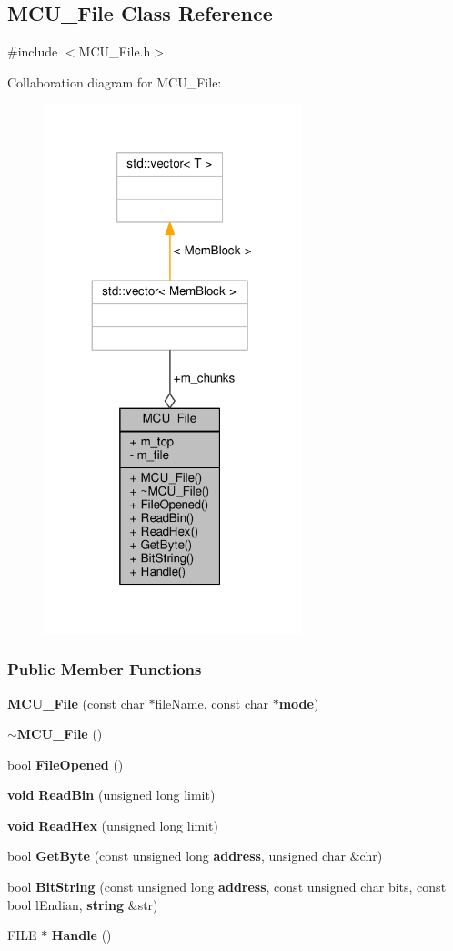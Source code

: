 \subsection{M\+C\+U\+\_\+\+File Class Reference}
\label{classMCU__File}


{\ttfamily \#include $<$M\+C\+U\+\_\+\+File.\+h$>$}



Collaboration diagram for M\+C\+U\+\_\+\+File\+:
\nopagebreak
\begin{figure}[H]
\begin{center}
\leavevmode
\includegraphics[width=212pt]{dc/d54/classMCU__File__coll__graph}
\end{center}
\end{figure}
\subsubsection*{Public Member Functions}
\begin{DoxyCompactItemize}
\item 
{\bf M\+C\+U\+\_\+\+File} (const char $\ast$file\+Name, const char $\ast${\bf mode})
\item 
{\bf $\sim$\+M\+C\+U\+\_\+\+File} ()
\item 
bool {\bf File\+Opened} ()
\item 
{\bf void} {\bf Read\+Bin} (unsigned long limit)
\item 
{\bf void} {\bf Read\+Hex} (unsigned long limit)
\item 
bool {\bf Get\+Byte} (const unsigned long {\bf address}, unsigned char \&chr)
\item 
bool {\bf Bit\+String} (const unsigned long {\bf address}, const unsigned char bits, const bool l\+Endian, {\bf string} \&str)
\item 
F\+I\+LE $\ast$ {\bf Handle} ()
\end{DoxyCompactItemize}
